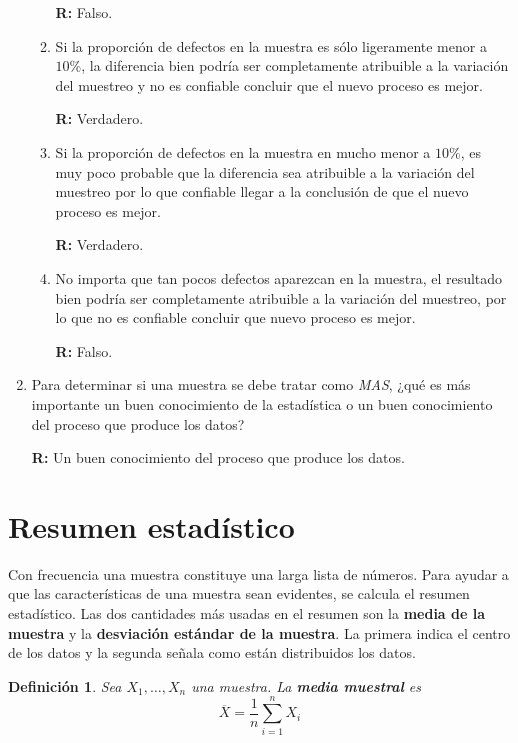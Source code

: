 \documentclass[10pt,a4paper]{book}
\newtheorem{defi}{\textbf{Definición}}
\begin{document}
\begin{enumerate}
\begin{enumerate}
		\textbf{R:} Falso.\\
		
		\item Si la proporción de defectos en la muestra es sólo ligeramente menor a $ 10\% $, la diferencia bien podría ser completamente atribuible a la variación del muestreo y no es confiable concluir que el nuevo proceso es mejor.

		\textbf{R:} Verdadero.\\
		
		\item Si la proporción de defectos en la muestra en mucho menor a $ 10\% $, es muy poco probable que la diferencia sea atribuible a la variación del muestreo por lo que confiable llegar a la conclusión de que el nuevo proceso es mejor.

		\textbf{R:} Verdadero.\\
		
		\item No importa que tan pocos defectos aparezcan en la muestra, el resultado bien podría ser completamente atribuible a la variación del muestreo, por lo que no es confiable concluir que nuevo proceso es mejor.
		
		\textbf{R:} Falso.
	\end{enumerate}

	\item Para determinar si una muestra se debe tratar como \textit{MAS}, ¿qué es más importante un buen conocimiento de la estadística o un buen conocimiento del proceso que produce los datos?
	
	\textbf{R:} Un buen conocimiento del proceso que produce los datos.
	
\end{enumerate}

\section{Resumen estadístico}


Con frecuencia una muestra constituye una larga lista de números. Para ayudar a que las características de una muestra sean evidentes, se calcula el resumen estadístico. Las dos cantidades más usadas en el resumen son la \textbf{media de la muestra} y la \textbf{desviación estándar de la muestra}. La primera indica el centro de los datos y la segunda señala como están distribuidos los datos.

\begin{defi}
	Sea $ X_1, \ldots, X_n $ una muestra. La \textbf{media muestral} es $$ \overline{X} = \frac{1}{n} \sum_{i=1}^{n} X_i $$
\end{defi}
\end{document}
